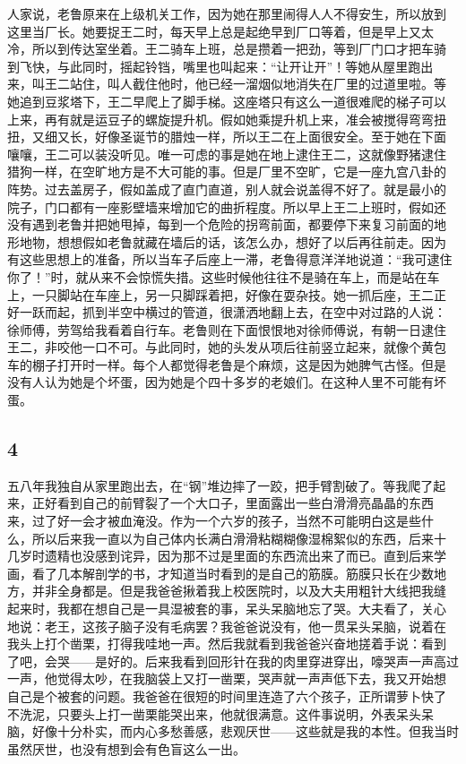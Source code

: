 人家说，老鲁原来在上级机关工作，因为她在那里闹得人人不得安生，所以放到
这里当厂长。她要捉王二时，每天早上总是起绝早到厂口等着，但是早上又太
冷，所以到传达室坐着。王二骑车上班，总是攒着一把劲，等到厂门口才把车骑
到飞快，与此同时，摇起铃铛，嘴里也叫起来：“让开让开”！等她从屋里跑出
来，叫王二站住，叫人截住他时，他已经一溜烟似地消失在厂里的过道里啦。等
她追到豆浆塔下，王二早爬上了脚手梯。这座塔只有这么一道很难爬的梯子可以
上来，再有就是运豆子的螺旋提升机。假如她乘提升机上来，准会被搅得弯弯扭
扭，又细又长，好像圣诞节的腊烛一样，所以王二在上面很安全。至于她在下面
嚷嚷，王二可以装没听见。唯一可虑的事是她在地上逮住王二，这就像野猪逮住
猎狗一样，在空旷地方是不大可能的事。但是厂里不空旷，它是一座九宫八卦的
阵势。过去盖房子，假如盖成了直门直道，别人就会说盖得不好了。就是最小的
院子，门口都有一座影壁墙来增加它的曲折程度。所以早上王二上班时，假如还
没有遇到老鲁并把她甩掉，每到一个危险的拐弯前面，都要停下来复习前面的地
形地物，想想假如老鲁就藏在墙后的话，该怎么办，想好了以后再往前走。因为
有这些思想上的准备，所以当车子后座上一滞，老鲁得意洋洋地说道：“我可逮住
你了！”时，就从来不会惊慌失措。这些时候他往往不是骑在车上，而是站在车
上，一只脚站在车座上，另一只脚踩着把，好像在耍杂技。她一抓后座，王二正
好一跃而起，抓到半空中横过的管道，很潇洒地翻上去，在空中对过路的人说：
徐师傅，劳驾给我看着自行车。老鲁则在下面恨恨地对徐师傅说，有朝一日逮住
王二，非咬他一口不可。与此同时，她的头发从项后往前竖立起来，就像个黄包
车的棚子打开时一样。每个人都觉得老鲁是个麻烦，这是因为她脾气古怪。但是
没有人认为她是个坏蛋，因为她是个四十多岁的老娘们。在这种人里不可能有坏
蛋。

\subsection{4} 

五八年我独自从家里跑出去，在“钢”堆边摔了一跤，把手臂割破了。等我爬了起
来，正好看到自己的前臂裂了一个大口子，里面露出一些白滑滑亮晶晶的东西
来，过了好一会才被血淹没。作为一个六岁的孩子，当然不可能明白这是些什
么，所以后来我一直以为自己体内长满白滑滑粘糊糊像湿棉絮似的东西，后来十
几岁时遗精也没感到诧异，因为那不过是里面的东西流出来了而已。直到后来学
画，看了几本解剖学的书，才知道当时看到的是自己的筋膜。筋膜只长在少数地
方，并非全身都是。但是我爸爸揪着我上校医院时，以及大夫用粗针大线把我缝
起来时，我都在想自己是一具湿被套的事，呆头呆脑地忘了哭。大夫看了，关心
地说：老王，这孩子脑子没有毛病罢？我爸爸说没有，他一贯呆头呆脑，说着在
我头上打个凿栗，打得我哇地一声。然后我就看到我爸爸兴奋地搓着手说：看到
了吧，会哭——是好的。后来我看到回形针在我的肉里穿进穿出，嚎哭声一声高过
一声，他觉得太吵，在我脑袋上又打一凿栗，哭声就一声声低下去，我又开始想
自己是个被套的问题。我爸爸在很短的时间里连造了六个孩子，正所谓萝卜快了
不洗泥，只要头上打一凿栗能哭出来，他就很满意。这件事说明，外表呆头呆
脑，好像十分朴实，而内心多愁善感，悲观厌世——这些就是我的本性。但我当时
虽然厌世，也没有想到会有色盲这么一出。

